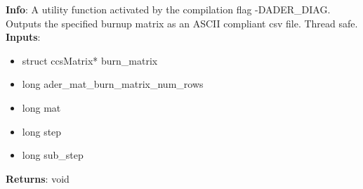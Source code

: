 \textbf{Info}: A utility function activated by the compilation flag
-DADER\_DIAG. Outputs the specified burnup matrix as an ASCII compliant csv
file. Thread safe. \\

\noindent \textbf{Inputs}:
\begin{itemize}
\item{struct ccsMatrix* burn\_matrix}
\item{long ader\_mat\_burn\_matrix\_num\_rows}
\item{long mat}
\item{long step}
\item{long sub\_step}
\end{itemize}

\noindent \textbf{Returns}: void
